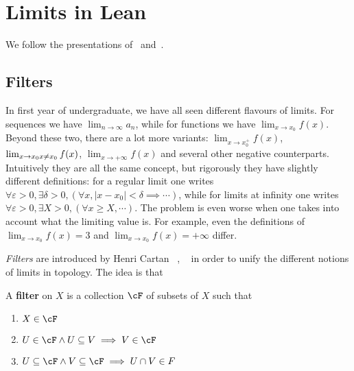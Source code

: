 \section{Limits in Lean}

We follow the presentations of~\cite{HIH2013} and~\cite{BCM2020}.

\subsection{Filters}


In first year of undergraduate, we have all seen different flavours of limits. For sequences we have \(\lim_{n \to \infty} a_n\), while for functions we have \(\lim_{x \to x_0} f(x)\). Beyond these two, there are a lot more variants: \(\lim_{x \to x_0^+} f(x)\), \(\lim_{x \to x_0 \\ x \neq x_0} f(x)\), \(\lim_{x \to +\infty} f(x)\) and several other negative counterparts. Intuitively they are all the same concept, but rigorously they have slightly different definitions: for a regular limit one writes \(\forall \varepsilon > 0, \exists \delta > 0, (\forall x, |x - x_0| < \delta \implies \cdots)\), while for limits at infinity one writes \(\forall \varepsilon > 0, \exists X > 0, (\forall x \geq X, \cdots)\). The problem is even worse when one takes into account what the limiting value is. For example, even the definitions of \(\lim_{x \to x_0} f(x) = 3\) and \(\lim_{x \to x_0} f(x) = +\infty\) differ.

\textit{Filters} are introduced by Henri Cartan ~\cite{Cartan1937a}, ~\cite{Cartan1937b} in order to unify the different notions of limits in topology. The idea is that 

\begin{definition}
  A \textbf{filter} on \(X\) is a collection \(\cF\) of subsets of \(X\) such that
  \begin{enumerate}
    \item \(X \in \cF\)
    \item \(U \in \cF \land U \subseteq V \implies V \in \cF\)
    \item \(U \subseteq \cF \land V \subseteq \cF \implies U \cap V \in F\)
  \end{enumerate}
\end{definition}

